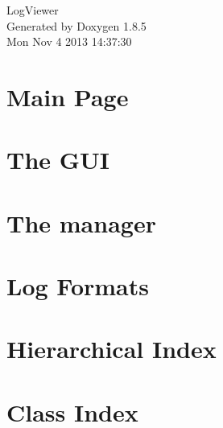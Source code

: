\documentclass[twoside]{book}
\newcommand{\clearemptydoublepage}{%
  \newpage{\pagestyle{empty}\cleardoublepage}%
}
\begin{document}
\hypersetup{pageanchor=false}
\begin{titlepage}
\vspace*{7cm}
\begin{center}%
{\Large Log\-Viewer }\\
\vspace*{1cm}
{\large Generated by Doxygen 1.8.5}\\
\vspace*{0.5cm}
{\small Mon Nov 4 2013 14:37:30}\\
\end{center}
\end{titlepage}
\clearemptydoublepage
\tableofcontents
\clearemptydoublepage
{}
\hypersetup{pageanchor=true}

\chapter{Main Page}
\label{index}\hypertarget{index}{}
\chapter{The G\-U\-I}
\label{_g_u_i}
\hypertarget{_g_u_i}{}

\chapter{The manager}
\label{_log_manager}
\hypertarget{_log_manager}{}

\chapter{Log Formats}
\label{_log_formats}
\hypertarget{_log_formats}{}

\chapter{Hierarchical Index}

\chapter{Class Index}

\end{document}

